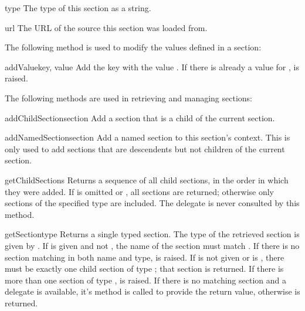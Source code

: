 \documentclass{howto}
\begin{document}
\begin{memberdesc}[Configuration]{type}
  The type of this section as a string.
\end{memberdesc}

\begin{memberdesc}[Configuration]{url}
  The URL of the source this section was loaded from.
\end{memberdesc}


The following method is used to modify the values defined in a
section:

\begin{methoddesc}[Configuration]{addValue}{key, value}
  Add the key  with the value .  If there is
  already a value for ,  is
  raised.
\end{methoddesc}


The following methods are used in retrieving and managing sections:

\begin{methoddesc}[Configuration]{addChildSection}{section}
  Add a section that is a child of the current section.
\end{methoddesc}

\begin{methoddesc}[Configuration]{addNamedSection}{section}
  Add a named section to this section's context.  This is only used to
  add sections that are descendents but not children of the current
  section.
\end{methoddesc}

\begin{methoddesc}[Configuration]{getChildSections}{}
  Returns a sequence of all child sections, in the order in which they
  were added.  If  is omitted or , all sections
  are returned; otherwise only sections of the specified type are
  included.  The delegate is never consulted by this method.
\end{methoddesc}

\begin{methoddesc}[Configuration]{getSection}{type}
  Returns a single typed section.  The type of the retrieved section
  is given by .  If  is given and not ,
  the name of the section must match .  If there is no
  section matching in both name and type,
   is
  raised.  If  is not given or is , there must be
  exactly one child section of type ; that section is
  returned.  If there is more than one section of type ,
   is raised.  If
  there is no matching section and a delegate is available, it's
   method is called to provide the return value,
  otherwise  is returned.
\end{methoddesc}
\end{document}
